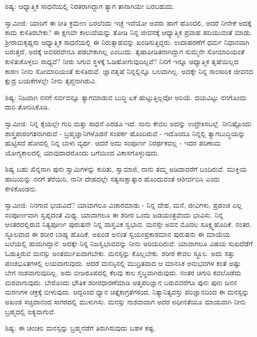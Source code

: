 ಶಿಷ್ಯ: ಆಧ್ಯಾತ್ಮಿಕ ಸಾಧನೆಯಲ್ಲಿ ನಿರತರಾಗಿದ್ದಾಗ ತ್ಯಾಗ ತಾನಾಗಿಯೇ ಬರಬಹುದು.

ಸ್ವಾಮೀಜಿ: ಯಾರಿಗೆ ಈ ರೀತಿ ಕ್ರಮೇಣ ಬರಲೆಂದು ಇಚ್ಛೆ ಇದೆಯೋ ಅವರು ಹಾಗೆ ಹೊಂದಲಿ, ಆದರೆ ನೀನೇಕೆ ಅದಕ್ಕೆ ಕಾದು ಕುಳಿತಿರಬೇಕು? ಈ ಕ್ಷಣವೇ ಕಾಲುವೆಯನ್ನು ತೋಡಿ ನಿನ್ನ ಜೀವನಕ್ಕೆ ಆಧ್ಯಾತ್ಮಿಕ ಪ್ರವಾಹ ಹರಿಯುವಂತೆ ಮಾಡು. ಶ‍್ರೀರಾಮಕೃಷ್ಣರು ಆಧ್ಯಾತ್ಮಿಕ ಸಾಧನೆಯಲ್ಲಿ ಈ ನಿರುತ್ಸಾಹವನ್ನು ಖಂಡಿಸುತ್ತಿದ್ದರು. ಉದಾಹರಣೆಗೆ ಧರ್ಮ ನಿಧಾನವಾಗಿ ಬರುತ್ತದೆ, ಅದಕ್ಕೆ ಅವಸರವೇನೂ ಪಡಬೇಕಾಗಿಲ್ಲ ಎಂಬುದು. ತೃಷಾಪೀಡಿತನಾಗಿದ್ದಾಗ ಸುಮ್ಮನೇ ಸೋಮಾರಿಯಂತೆ ಕುಳಿತುಕೊಳ್ಳಲು ಸಾಧ್ಯವೆ? ನೀರು ಸಿಗುವ ಸ್ಥಳಕ್ಕೆ ಓಡಿಹೋಗುವುದಿಲ್ಲವೆ? ನಿನಗೆ ಇನ್ನೂ ಆಧ್ಯಾತ್ಮಿಕ ತೃಷೆಯಿಲ್ಲದ ಕಾರಣ ನೀನು ಸೋಮಾರಿಯಂತೆ ಕುಳಿತಿರುವೆ. ಜ್ಞಾನತೃಷೆ ನಿನ್ನಲ್ಲಿನ್ನೂ ಬಲವಾಗಿಲ್ಲ. ಅದಕ್ಕೇ ನಿನ್ನ ಸಾಂಸಾರಿಕ ಜೀವನದ ಕ್ಷುದ್ರ ಬಯಕೆಗಳಲ್ಲೇ ನೀನು ತೃಪ್ತನಾಗಿರುವಿ.

ಶಿಷ್ಯ: ನಿಜವಾಗಿ ನನಗೆ ಸರ್ವವನ್ನೂ ತ್ಯಾಗಮಾಡುವ ಬುದ್ಧಿ ಏಕೆ ಹುಟ್ಟುತ್ತಿಲ್ಲವೋ ಅರಿಯೆ. ದಯವಿಟ್ಟು ನನಗೊಂದು ದಾರಿ ತೋರಿಸಿಕೊಡಿ.

ಸ್ವಾಮೀಜಿ: ನಿನ್ನ ಕೈಯಲ್ಲೇ ಗುರಿ ಮತ್ತು ಸಾಧನೆ ಎರಡೂ ಇದೆ. ನಾನು ಕೇವಲ ಅದನ್ನು ಉದ್ರೇಕಿಸಬಲ್ಲೆ. ನೀನಿಷ್ಟೊಂದು ಶಾಸ್ತ್ರಪಾರಂಗತನಾಗಿರುವೆ - ಬ್ರಹ್ಮಜ್ಞಾನಿಗಳೊಡನೆ ಸಂಪರ್ಕ ಹೊಂದಿರುವೆ - ಇದೊಂದೂ ನಿನ್ನಲ್ಲಿ ತ್ಯಾಗಬುದ್ಧಿಯನ್ನು ಹುಟ್ಟಿಸದೆ ಹೋದಲ್ಲಿ ನಿನ್ನ ಬಾಳು ವ್ಯರ್ಥ. ಆದರೆ ಅದು ಸಂಪೂರ್ಣ ನಿರರ್ಥಕವಲ್ಲ - ಇದರ ಪರಿಣಾಮ ಯೋಗ್ಯಕಾಲದಲ್ಲಿ ಯಾವುದಾದರೊಂದು ಬಗೆಯಿಂದ ವಿಕಾಸಗೊಳ್ಳುವುದು.

ಶಿಷ್ಯ ಬಹು ಖಿನ್ನನಾಗಿ ಪುನಃ ಸ್ವಾಮಿಗಳನ್ನು ಕುರಿತು, ಸ್ವಾಮಾಜಿ, ನಾನು ತಮ್ಮ ಅಡಿದಾವರೆಗೆ ಬಂದಿರುವೆ. ಮುಕ್ತಿಯ ಹಾದಿಯನ್ನು ನನಗೆ ತೆರೆಯಿರಿ, ನಾನೀ ದೇಹದಲ್ಲೇ ಸತ್ಯಸಾಕ್ಷಾತ್ಕಾರ ಹೊಂದುವಂತೆ ಆಶೀರ್ವದಿಸಿ ಎಂದು ಕೇಳಿಕೊಂಡನು.

ಸ್ವಾಮೀಜಿ: ನಿನಗಾವ ಭಯವಿದೆ? ಯಾವಾಗಲೂ ವಿಚಾರಮಾಡು - ನಿನ್ನ ದೇಹ, ಮನೆ, ಜೀವಿಗಳು, ಪ್ರಪಂಚ ಎಲ್ಲ ಸಂಪೂರ್ಣವಾಗಿ ಸ್ವಪ್ನದಂತೆ ಮಿಥ್ಯ. ಯಾವಾಗಲೂ ಈ ಶರೀರ ಒಂದು ಜಡಯಂತ್ರವೆಂದು ಭಾವಿಸು. ನಿನ್ನ ಆಂತರದಲ್ಲಿರುವ ನಿತ್ಯಪೂರ್ಣ ಪುರುಷನೇ ನಿನ್ನ ವಾಸ್ತವಿಕ ಸ್ವಭಾವ. ಮನಸ್ಸೇ ಅವನ ಮೊದಲ ಸೂಕ್ಷ್ಮಹೊದಿಕೆ. ನಂತರ, ಸ್ಥೂಲವಾದ ಈ ಶರೀರ ಬಾಹ್ಯ ಹೊದಿಕೆ, ಅಖಂಡ ಅನಂತ ಸ್ವಯಂಪ್ರಕಾಶಮಾನ ಪುರುಷನು ಈ ಮಾಯೆಯ ಬಲೆಯಲ್ಲಿ ಹುದುಗಿದ್ದಾನೆ. ಅದಕ್ಕೇ ನಿನ್ನ ನಿಜಸ್ವಭಾವವನ್ನು ನೀನು ಅರಿಯದಿರುವೆ. ಯಾವಾಗಲೂ ವಿಷಯ ಸುಖದೆಡೆಗೆ ಓಡುತ್ತಿರುವ ಮನಸ್ಸು ಅಂತರ್ಮುಖವಾಗಬೇಕು. ಮನಸ್ಸನ್ನು ಕೊಲ್ಲಬೇಕು. ಶರೀರ ಕೇವಲ ಸ್ಥೂಲ. ಅದು ಸತ್ತು ಪಂಚಭೂತಗಳಲ್ಲಿ ಲಯವಾಗುವುದು. ಆದರೆ ಮನಸ್ಸಿನಲ್ಲಿ ಮುದ್ರಿತವಾದ ಆ ಮಾನಸಿಕ ಅನುಭವಗಳ ಕಂತೆ ಅಷ್ಟು ಬೇಗ ನಾಶವಾಗುವುದಿಲ್ಲ. ಅದು ಬೀಜರೂಪದಲ್ಲಿ ಕೆಲವು ಕಾಲ ಸ್ತಬ್ಧವಾಗಿರುವುದು. ನಂತರ ಚಿಗುರಿ ಕವಲೊಡೆದು ಮರವಾಗುವುದು. ಬೇರೊಂದು ಭೌತಿಕ ಶರೀರಧಾರಣೆಮಾಡಿ ಆತ್ಮಪರಿಜ್ಞಾನ ಬರುವವರೆಗೂ ಪುನಃ ಪುನಃ ಜನನ ಮರಣಗಳ ಚಕ್ರಕ್ಕೆ ಬೀಳುವುದು. ಆದ್ದರಿಂದ ಧ್ಯಾನ ಚಿತ್ತೈಕಾಗ್ರತೆಗಳಿಂದ, ನಿತ್ಯಾನಿತ್ಯವಸ್ತು ಪರಿಜ್ಞಾನದಿಂದ ಈ ಮನಸ್ಸನ್ನು ಅಖಂಡ ಸಚ್ಚಿದಾನಂದ ಸಾಗರದಲ್ಲಿ ಮುಳುಗಿಸು. ಮನಸ್ಸು ನಾಶವಾದಾಗ ಅದರ ಅಧೀನತೆಯೂ ಮಾಯವಾಗಿ ನೀನು ಬ್ರಹ್ಮದಲ್ಲಿ ಐಕ್ಯವಾಗುವೆ.

ಶಿಷ್ಯ: ಈ ಚಂಚಲ ಮನಸ್ಸನ್ನು ಬ್ರಹ್ಮನೆಡೆಗೆ ತಿರುಗಿಸುವುದು ಬಹಳ ಕಷ್ಟ.

